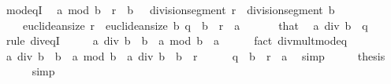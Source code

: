 \begin{isabellebody}
\isamarkupfalse%
\ mod{\isacharunderscore}{\kern0pt}eqI{\isacharcolon}{\kern0pt}\isanewline
\ \ {\isachardoublequoteopen}a\ mod\ b\ {\isacharequal}{\kern0pt}\ r{\isachardoublequoteclose}\ \ {\isachardoublequoteopen}b\ {\isasymnoteq}\ {}{\isachardoublequoteclose}\ {\isachardoublequoteopen}division{\isacharunderscore}{\kern0pt}segment\ r\ {\isacharequal}{\kern0pt}\ division{\isacharunderscore}{\kern0pt}segment\ b{\isachardoublequoteclose}\isanewline
\ \ \ \ {\isachardoublequoteopen}euclidean{\isacharunderscore}{\kern0pt}size\ r\ {\isacharless}{\kern0pt}\ euclidean{\isacharunderscore}{\kern0pt}size\ b{\isachardoublequoteclose}\ {\isachardoublequoteopen}q\ {\isacharasterisk}{\kern0pt}\ b\ {\isacharplus}{\kern0pt}\ r\ {\isacharequal}{\kern0pt}\ a{\isachardoublequoteclose}\ \isanewline
%
\isadelimproof
%
\endisadelimproof
%
\isatagproof
{}\isamarkupfalse%
\ {\isacharminus}{\kern0pt}\isanewline
\ \ \isamarkupfalse%
\ that\ \isamarkupfalse%
\ {\isachardoublequoteopen}a\ div\ b\ {\isacharequal}{\kern0pt}\ q{\isachardoublequoteclose}\isanewline
\ \ \ \ \isamarkupfalse%
\ {\isacharparenleft}{\kern0pt}rule\ div{\isacharunderscore}{\kern0pt}eqI{\isacharparenright}{\kern0pt}\isanewline
\ \ \isamarkupfalse%
\ \isamarkupfalse%
\ {\isachardoublequoteopen}a\ div\ b\ {\isacharasterisk}{\kern0pt}\ b\ {\isacharplus}{\kern0pt}\ a\ mod\ b\ {\isacharequal}{\kern0pt}\ a{\isachardoublequoteclose}\isanewline
\ \ \ \ \isamarkupfalse%
\ {\isacharparenleft}{\kern0pt}fact\ div{\isacharunderscore}{\kern0pt}mult{\isacharunderscore}{\kern0pt}mod{\isacharunderscore}{\kern0pt}eq{\isacharparenright}{\kern0pt}\isanewline
\ \ \isamarkupfalse%
\ \isamarkupfalse%
\ {\isachardoublequoteopen}a\ div\ b\ {\isacharasterisk}{\kern0pt}\ b\ {\isacharplus}{\kern0pt}\ a\ mod\ b\ {\isacharequal}{\kern0pt}\ a\ div\ b\ {\isacharasterisk}{\kern0pt}\ b\ {\isacharplus}{\kern0pt}\ r{\isachardoublequoteclose}\isanewline
\ \ \ \ \isamarkupfalse%
\ {\isacartoucheopen}q\ {\isacharasterisk}{\kern0pt}\ b\ {\isacharplus}{\kern0pt}\ r\ {\isacharequal}{\kern0pt}\ a{\isacartoucheclose}\ \isamarkupfalse%
\ simp\isanewline
\ \ \isamarkupfalse%
\ \isamarkupfalse%
\ {\isacharquery}{\kern0pt}thesis\isanewline
\ \ \ \ \isamarkupfalse%
\ simp\isanewline
{}\isamarkupfalse%
%
\endisatagproof
{\isafoldproof}%
%
\isadelimproof
\isanewline

\end{isabellebody}
